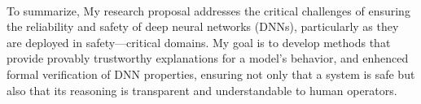 \documentclass{llncs}
\begin{document}
\paragraph{}
To summarize, My research proposal addresses the critical challenges of ensuring the reliability and safety of deep neural networks (DNNs), 
particularly as they are deployed in safety---critical domains. 
My goal is to develop methods that provide provably trustworthy explanations for a model's behavior, and enhenced formal verification of DNN properties, ensuring not only that a system is safe 
but also that its reasoning is transparent and understandable to human operators.


\end{document}

